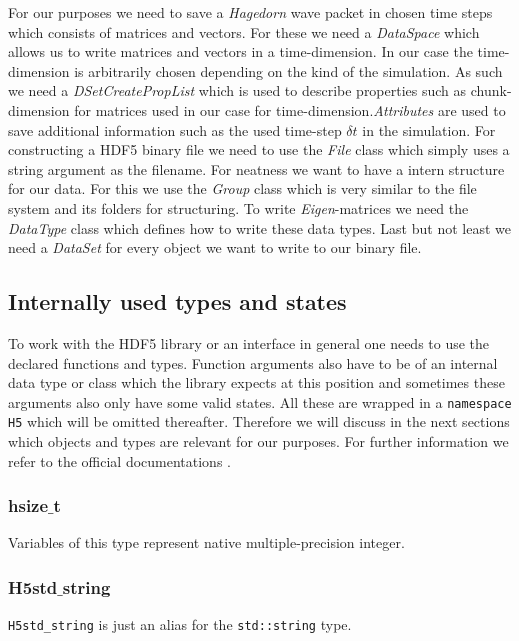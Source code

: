 \documentclass{article}
\begin{document}
For our purposes we need to save a \textit{Hagedorn} wave packet in chosen time steps which consists of matrices and vectors. 
For these we need a \textit{DataSpace} which allows us to write matrices and vectors in a time-dimension. In our case the time-dimension is arbitrarily chosen depending on the kind of the simulation. As such we need a \textit{DSetCreatePropList} which is used to describe properties such as chunk-dimension for matrices used in our case for time-dimension.\textit{Attributes} are used to save additional information such as the used time-step $\delta t$ in the simulation. For constructing a HDF5 binary file we need to use the \textit{File} class which simply uses a string argument as the filename. For neatness we want to have a intern structure for our data. For this we use the \textit{Group} class which is very similar to the file system and its folders for structuring. To write \textit{Eigen}-matrices we need the \textit{DataType} class which defines how to write these data types. Last but not least we need a \textit{DataSet} for every object we want to write to our binary file.

\subsection{Internally used types and states}
To work with the HDF5 library or an interface in general one needs to use the declared functions and types. Function arguments also have to be of an internal data type or class which the library expects at this position and sometimes these arguments also only have some valid states. All these are wrapped in a \texttt{namespace H5} which will be omitted thereafter. Therefore we will discuss in the next sections which objects and types are relevant for our purposes. For further information we refer to the official documentations \cite{hdf5cppdoc} \cite{hdf5cdoc}.
\subsubsection{hsize$\_$t}
Variables of this type represent native multiple-precision integer. 
\subsubsection{H5std$\_$string}
\texttt{H5std\_string} is just an alias for the \texttt{std::string} type.
\end{document}
